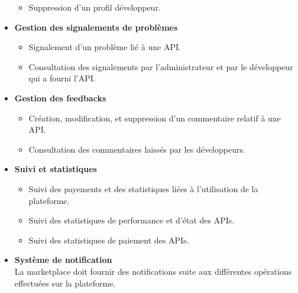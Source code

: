 \begin{itemize}
\begin{itemize}
             \item Suppression d'un profil développeur.
         \end{itemize}
         \item \textbf{Gestion des signalements de problèmes}
         \begin{itemize}
             \item Signalement d’un problème lié à une API.
             \item Consultation des signalements par l’administrateur et par le développeur qui a fourni l’API.  
         \end{itemize}
         \item \textbf{Gestion des feedbacks}
         \begin{itemize}
             \item Création, modification, et suppression d’un commentaire relatif à une API.
             \item Consultation des commentaires laissés par les développeurs. 
         \end{itemize}
         \item \textbf{Suivi et statistiques }
         \begin{itemize}
             \item Suivi des payements et des statistiques liées à l’utilisation de la plateforme.
             \item Suivi des statistiques de performance et d'état des APIs.
             \item Suivi des statistiques de paiement des APIs.
         \end{itemize}
         \item \textbf{Système de notification  } \\
         La marketplace doit fournir des notifications suite aux différentes opérations effectuées sur la plateforme.
    \end{itemize}        
